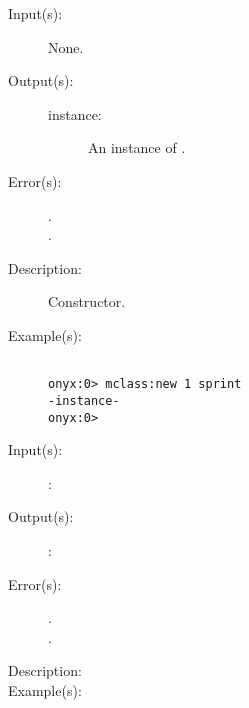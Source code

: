 \begin{description}
\label{mclass:new}
\item[{\onyxop{--}{new}{instance}}: ]
	\begin{description}\item[]
	\item[Input(s): ] None.
	\item[Output(s): ]
		\begin{description}\item[]
		\item[instance: ]
			An instance of .
		\end{description}
	\item[Error(s): ]
		\begin{description}\item[]
		\item[.]
		\item[.]
		\end{description}
	\item[Description: ]
		Constructor.
	\item[Example(s): ]\begin{verbatim}

onyx:0> mclass:new 1 sprint
-instance-
onyx:0>
		\end{verbatim}
	\end{description}
\label{mclass:XXX}
\item[{\onyxop{METHODINS}{XXX}{METHODOUTS}}: ]
	\begin{description}\item[]
	\item[Input(s): ]
		\begin{description}\item[]
		\item[: ]
		\end{description}
	\item[Output(s): ]
		\begin{description}\item[]
		\item[: ]
		\end{description}
	\item[Error(s): ]
		\begin{description}\item[]
		\item[.]
		\item[.]
		\end{description}
	\item[Description: ]
	\item[Example(s): ]\begin{verbatim}

		\end{verbatim}
	\end{description}
\end{description}
